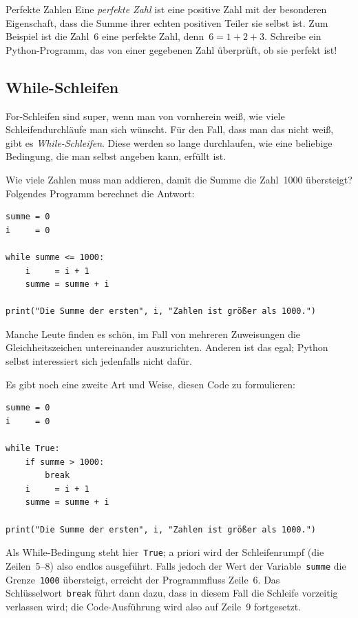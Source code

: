 \documentclass{blatt}
\begin{document}
\begin{aufgabe}{Perfekte Zahlen}
Eine \emph{perfekte Zahl} ist eine positive Zahl mit der besonderen
Eigenschaft, dass die Summe ihrer echten positiven Teiler sie selbst ist. Zum
Beispiel ist die Zahl~$6$ eine perfekte Zahl, denn~$6 = 1 + 2 + 3$.
Schreibe ein Python-Programm, das von einer gegebenen Zahl überprüft, ob sie
perfekt ist!
\end{aufgabe}


\subsection{While-Schleifen}

For-Schleifen sind super, wenn man von vornherein weiß, wie viele
Schleifendurchläufe man sich wünscht. Für den Fall, dass man das nicht weiß,
gibt es \emph{While-Schleifen}. Diese werden so lange durchlaufen, wie eine
beliebige Bedingung, die man selbst angeben kann, erfüllt ist.

Wie viele Zahlen muss man addieren, damit die Summe die Zahl~1000 übersteigt?
Folgendes Programm berechnet die Antwort:
\begin{verbatim}
summe = 0
i     = 0

while summe <= 1000:
    i     = i + 1
    summe = summe + i

print("Die Summe der ersten", i, "Zahlen ist größer als 1000.")
\end{verbatim}
Manche Leute finden es schön, im Fall von mehreren Zuweisungen die
Gleichheitszeichen untereinander auszurichten. Anderen ist das egal; Python
selbst interessiert sich jedenfalls nicht dafür.

Es gibt noch eine zweite Art und Weise, diesen Code zu formulieren:
\begin{verbatim}
summe = 0
i     = 0

while True:
    if summe > 1000:
        break
    i     = i + 1
    summe = summe + i

print("Die Summe der ersten", i, "Zahlen ist größer als 1000.")
\end{verbatim}
Als While-Bedingung steht hier~\texttt{True}; a priori wird der
Schleifenrumpf (die Zeilen~5--8) also endlos ausgeführt. Falls jedoch der Wert
der Variable~\texttt{summe} die Grenze~\texttt{1000}
übersteigt, erreicht der Programmfluss Zeile~6. Das
Schlüsselwort~\texttt{break} führt dann dazu, dass in diesem Fall die
Schleife vorzeitig verlassen wird; die Code-Ausführung wird also auf Zeile~9
fortgesetzt.
\end{document}
